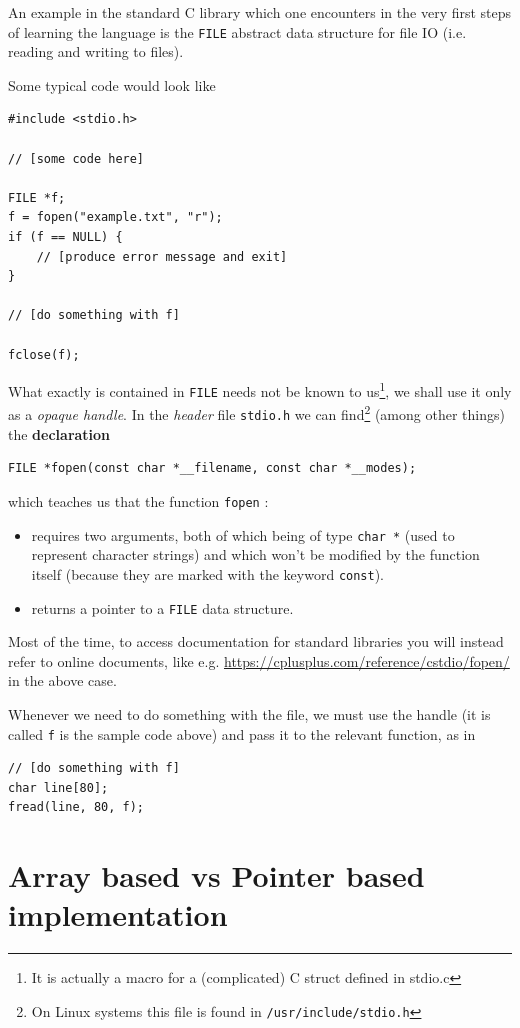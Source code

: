 \documentclass[12pt]{article}
\theoremstyle{plain}
\theoremstyle{remark}
\begin{document}
\medskip

An example in the standard C library which one encounters in the very first
steps of learning the language is the {\tt FILE} abstract data structure
for file IO (i.e. reading and writing to files).

Some typical code would look like

\begin{lstlisting}[style=C]
#include <stdio.h>

// [some code here]

FILE *f;  
f = fopen("example.txt", "r");
if (f == NULL) {
	// [produce error message and exit]
}

// [do something with f]

fclose(f);
\end{lstlisting}

What exactly is contained in {\tt FILE} needs not be known to us\footnote{It is actually
a macro for a (complicated) C struct defined in stdio.c}, we shall use it only as
a {\it opaque handle}. In the {\it header} file {\tt stdio.h} we can
find\footnote{On Linux systems this file is found in {\tt /usr/include/stdio.h}} 
(among other things) the {\bf declaration}
\begin{lstlisting}[style=C]
FILE *fopen(const char *__filename, const char *__modes);
\end{lstlisting}
which teaches us that the function {\tt fopen} :
\begin{itemize}
	\item requires two arguments, both of which being of type 
		{\tt char *} (used to represent character strings) and 
		which won't be modified by the function itself (because they 
		are marked with the keyword {\tt const}).
	\item returns a pointer to a {\tt FILE} data structure.
\end{itemize}
Most of the time, to access documentation for standard libraries you will
instead refer to online documents, like e.g. 
\url{https://cplusplus.com/reference/cstdio/fopen/} in the above case.

Whenever we need to do something with the file, we must use the handle (it is
called {\tt f} is the sample code above) and pass it to the relevant function, as in
\begin{lstlisting}[style=C]
// [do something with f]
char line[80];
fread(line, 80, f);
\end{lstlisting}

\section{Array based vs Pointer based implementation} 
\end{document}

